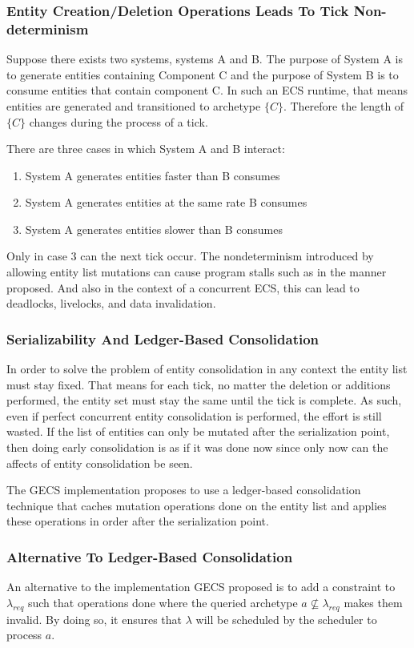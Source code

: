 \subsubsection{Entity Creation/Deletion Operations Leads To Tick Non-determinism}
\label{sec:proof1}
Suppose there exists two systems, systems A and B. The purpose of System A is to generate entities containing Component C and the purpose of System B is to consume entities that contain component C. In such an ECS runtime, that means entities are generated and transitioned to archetype $\{C\}$. Therefore the length of $\{C\}$ changes during the process of a tick. 

There are three cases in which System A and B interact:
\begin{enumerate}
    \item System A generates entities faster than B consumes
    \item System A generates entities at the same rate B consumes
    \item System A generates entities slower than B consumes
\end{enumerate}

Only in case 3 can the next tick occur. The nondeterminism introduced by allowing entity list mutations can cause program stalls such as in the manner proposed. And also in the context of a concurrent ECS, this can lead to deadlocks, livelocks, and data invalidation.

\subsubsection{Serializability And Ledger-Based Consolidation}
\label{sec:ledger}
In order to solve the problem of entity consolidation in any context the entity list must stay fixed. That means for each tick, no matter the deletion or additions performed, the entity set must stay the same until the tick is complete. As such, even if perfect concurrent entity consolidation is performed, the effort is still wasted. If the list of entities can only be mutated after the serialization point, then doing early consolidation is as if it was done now since only now can the affects of entity consolidation be seen. 

The GECS implementation proposes to use a ledger-based consolidation technique that caches mutation operations done on the entity list and applies these operations in order after the serialization point.

\subsubsection{Alternative To Ledger-Based Consolidation}
An alternative to the implementation GECS proposed is to add a constraint to $\lambda_{req}$ such that operations done where the queried archetype $a \not\subseteq \lambda_{req}$ makes them invalid. By doing so, it ensures that $\lambda$ will be scheduled by the scheduler to process $a$. 

